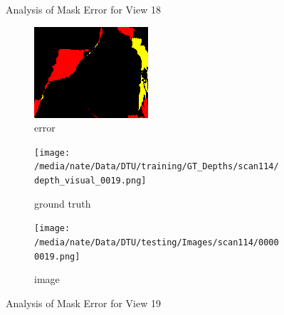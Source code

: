 \documentclass{article}
\begin{document}
\begin{figure}
\begin{subfigure}{0.3\textwidth}
		\label{fig:img18}
	\end{subfigure}
	\hfill
	\caption{Analysis of Mask Error for View 18}
	\label{fig:error_analys18}
\end{figure}\begin{figure}
	\centering
	\begin{subfigure}{0.3\textwidth}
		\centering
		\includegraphics[width=\textwidth]{./output/019_error.png}
		\caption{error}
		\label{fig:error19}
	\end{subfigure}
	\hfill
	\centering
	\begin{subfigure}{0.3\textwidth}
		\centering
		\texttt{[image: /media/nate/Data/DTU/training/GT\_Depths/scan114/depth\_visual\_0019.png]}
		\caption{ground truth}
		\label{fig:gt19}
	\end{subfigure}
	\hfill
	\centering
	\begin{subfigure}{0.3\textwidth}
		\centering
		\texttt{[image: /media/nate/Data/DTU/testing/Images/scan114/00000019.png]}
		\caption{image}
		\label{fig:img19}
	\end{subfigure}
	\hfill
	\caption{Analysis of Mask Error for View 19}
	\label{fig:error_analys19}
\end{figure}\begin{figure}
	\centering
	\begin{subfigure}{0.3\textwidth}
		\centering

\end{subfigure}
\end{figure}
\end{document}
